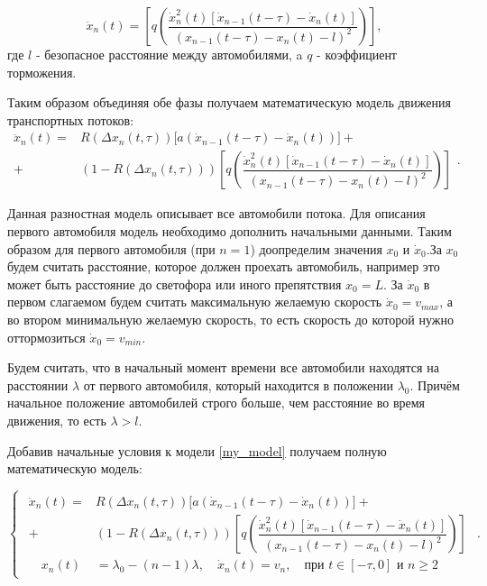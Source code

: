 \documentclass[12pt, a4paper]{extarticle}
\numberwithin{equation}{section}
\begin{document}
\begin{equation*}
\ddot{x}_n(t)= \left[  q\left(  \dfrac{\dot{x}_n^2(t)\left[  \dot{x}_{n-1}(t-\tau) - \dot{x}_n(t) \right]}{(x_{n-1}(t-\tau)-x_n(t)-l)^2}\right) \right],
\end{equation*}
где $l$ - безопасное расстояние между автомобилями, a $q$ - коэффициент торможения.

Таким образом объединяя обе фазы получаем математическую модель движения транспортных потоков:
\begin{equation} \label{my_model} 
\begin{split}
\ddot{x}_n(t)= &R(\Delta x_n(t,\tau))\bigg[ a(\dot{x}_{n-1}(t-\tau)-\dot{x}_n(t))\bigg]  +\\+& (1-R(\Delta x_n(t,\tau)))\left[  q\left(  \dfrac{\dot{x}_n^2(t)\left[  \dot{x}_{n-1}(t-\tau) - \dot{x}_n(t) \right]}{(x_{n-1}(t-\tau)-x_n(t)-l)^2}\right) \right] 
\end{split}.
\end{equation}

Данная разностная модель описывает все автомобили потока. Для описания первого автомобиля модель необходимо дополнить начальными данными. Таким образом для первого автомобиля (при $n=1$) доопределим значения $x_{0}$ и $\dot{x}_{0}$.За $x_{0}$ будем считать расстояние, которое должен проехать автомобиль, например это может быть расстояние до светофора или иного препятствия $x_{0}=L$. За $\dot{x}_{0}$ в первом слагаемом будем считать максимальную желаемую скорость $\dot{x}_{0}=v_{max}$, а во втором минимальную желаемую скорость, то есть скорость до которой нужно оттормозиться $\dot{x}_{0}=v_{min}$.

Будем считать, что в начальный момент времени все автомобили находятся на расстоянии $\lambda$ от первого автомобиля, который находится в положении $\lambda_0$. Причём начальное положение автомобилей строго больше, чем расстояние во время движения, то есть $\lambda > l$.

Добавив начальные условия к модели \eqref{my_model} получаем полную математическую модель:

\begin{equation} \label{new_model} 
\begin{cases}
\begin{split}
\ddot{x}_n(t)= &R(\Delta x_n(t,\tau))\bigg[ a(\dot{x}_{n-1}(t-\tau)-\dot{x}_n(t))\bigg]  +\\+& (1-R(\Delta x_n(t,\tau)))\left[  q\left(  \dfrac{\dot{x}_n^2(t)\left[  \dot{x}_{n-1}(t-\tau) - \dot{x}_n(t) \right]}{(x_{n-1}(t-\tau)-x_n(t)-l)^2}\right) \right] \\
 \quad x_n(t)&=\lambda_0-(n-1)\lambda, \quad \dot{x}_n(t)=v_{n}, \quad \text{при } t \in [-\tau,0] \text{ и } n\geq2
\end{split}
\end{cases}.
\end{equation}
\end{document}
